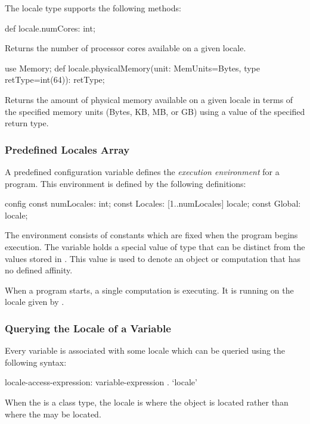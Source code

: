 The locale type supports the following methods:

\begin{protohead}
def locale.numCores: int;
\end{protohead}
\begin{protobody}
Returns the number of processor cores available on a given locale.
\end{protobody}

\begin{protohead}
use Memory;
def locale.physicalMemory(unit: MemUnits=Bytes, type retType=int(64)): retType;
\end{protohead}
\begin{protobody}
Returns the amount of physical memory available on a given locale in
terms of the specified memory units (Bytes, KB, MB, or GB) using a
value of the specified return type.
\end{protobody}

\subsubsection{Predefined Locales Array}
\label{Predefined_Locales_Array}

A predefined configuration variable defines the {\em execution
environment} for a program.  This environment is defined by the
following definitions:
\begin{chapel}
config const numLocales: int;
const Locales: [1..numLocales] locale;
const Global: locale;
\end{chapel}
The environment consists of constants which are fixed when the program
begins execution.  The variable  holds a special value
of  type that can be distinct from the values stored
in . This value is used to denote an object or
computation that has no defined affinity.

When a program starts, a single computation is executing.  It is
running on the locale given by .

\subsubsection{Querying the Locale of a Variable}
\label{Querying_the_Locale_of_a_Variable}

Every variable  is associated with some locale which can be
queried using the following syntax:
\begin{syntax}
locale-access-expression:
  variable-expression . `locale'
\end{syntax}
When the  is a class type, the locale is where the
object is located rather than where the  may be
located.

